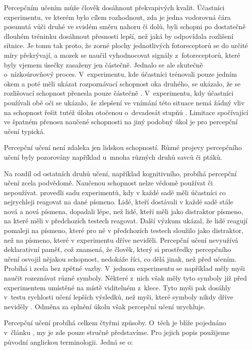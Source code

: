Percepčním učením může člověk dosáhnout překvapivých kvalit. Účastníci
experimentu, ve kterém bylo cílem rozhodnout, zda je jedna vodorovná čára
posunutá vůči druhé ve svislém směru nahoru či dolů, byli schopni po dostatečně
dlouhém tréninku dosáhnout přesnosti lepší, než jaká by odpovídala rozlišení
sítnice. Je tomu tak proto, že zorné plochy jednotlivých fotoreceptorů se do
určité míry překrývají, a mozek se naučil vyhodnocovat signály z~fotoreceptorů,
které byly vjemem úsečky zasaženy jen částečně. Jednalo se ale skutečně
o~nízkoúrovňový proces.  V~experimentu, kde účastníci trénovali pouze jedním okem
a poté měli ukázat rozpoznávací schopnost oka druhého, se ukázalo, že se
rozlišovací schopnost přenesla pouze částečně \citep{VisualLinesEye}. V~experimentu, kdy účastníci
používali obě oči se ukázalo, že zlepšení ve vnímání této situace nemá žádný
vliv na schopnost řešit tutéž úlohu otočenou o~devadesát stupňů \citep{VisualLines}.  
Limitace spočívající ve špatném přenosu naučené schopnosti na jiný podobný úkol
je pro percepční učení typická.

Percepční učení není zdaleka jen lidskou schopností. Různé projevy percepčního
učení byly pozorovány například u~mnoha různých druhů savců či ptáků. 

Na rozdíl od ostatních druhů učení, například kognitivního, probíhá percepční
učení zcela podvědomě. Naučenou schopnost nelze vědomě používat či nepoužívat.
\citet{DistraktoryCile} provedli sadu experimentů, kdy v každé sadě měli
účastníci co nejrychleji reagovat na dané písmeno. Lidé, kteří dostávali v
každé sadě stále nová a nová písmena, dopadali lépe, než lidé, kteří měli jako
distraktor písmeno, na které měli v předchozích testech reagovat. Další výzkum
\citep{ANaopak} ukázal, že lidé reagují pomaleji na písmeno, které pro ně v
předchozích testech sloužilo jako distraktor, než na písmeno, které v
experimentu dříve neviděli. Percepční učení nevyužívá deklarativní paměť, což
znamená, že člověk, který si prostředky percepčního učení osvojil nějakou
schopnost, nedokáže říci, co dělá jinak, než před učením. Probíhá i zcela bez
zpětné vazby. V~jednom experimentu se například měly myši naučit rozeznávat
různé symboly. Některé z~nich však měly tyto symboly již před experimentem
umístěné na místě viditelném z~klece. Tyto myši pak dosáhly v~testu rychlosti
učení lepších výsledků, než myši, které symboly nikdy dříve neviděly
\citep{Rats}. Odměna za splnění úkolu však percepční učení urychluje.

Percepční učení probíhá celkem čtyřmi způsoby. O~těch je blíže pojednáno
v~článku \citep{uceni}, my je zde pouze stručně představíme. Pro jejich popis použijeme původní anglickou terminologii. Jedná se o:

